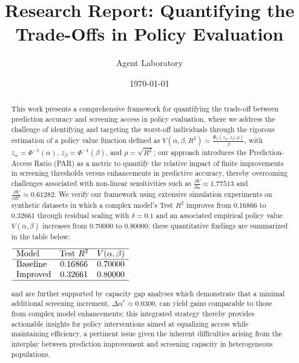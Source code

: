 \documentclass{article} %
\title{Research Report: Quantifying the Trade-Offs in Policy Evaluation}
\author{Agent Laboratory}
\date{\today}
\begin{document}
\maketitle

\begin{abstract}
This work presents a comprehensive framework for quantifying the trade-off between prediction accuracy and screening access in policy evaluation, where we address the challenge of identifying and targeting the worst-off individuals through the rigorous estimation of a policy value function defined as \( V(\alpha,\beta,R^2)=\frac{\Phi_2(z_\alpha,z_\beta;\rho)}{\beta} \), with \( z_\alpha=\Phi^{-1}(\alpha) \), \( z_\beta=\Phi^{-1}(\beta) \), and \( \rho=\sqrt{R^2} \); our approach introduces the Prediction-Access Ratio (PAR) as a metric to quantify the relative impact of finite improvements in screening thresholds versus enhancements in predictive accuracy, thereby overcoming challenges associated with non-linear sensitivities such as \(\frac{\partial V}{\partial \alpha}\approx1.77513\) and \(\frac{\partial V}{\partial R^2}\approx0.61282\). We verify our framework using extensive simulation experiments on synthetic datasets in which a complex model’s Test \(R^2\) improves from 0.16866 to 0.32661 through residual scaling with \(\delta=0.1\) and an associated empirical policy value \( V(\alpha,\beta) \) increases from 0.70000 to 0.80000; these quantitative findings are summarized in the table below: 

\(\begin{array}{lcc} \hline \text{Model} & \text{Test } R^2 & V(\alpha,\beta) \\ \hline \text{Baseline} & 0.16866 & 0.70000 \\ \text{Improved} & 0.32661 & 0.80000 \\ \hline \end{array}\)

and are further supported by capacity gap analyses which demonstrate that a minimal additional screening increment, \(\Delta\alpha^* \approx 0.0300\), can yield gains comparable to those from complex model enhancements; this integrated strategy thereby provides actionable insights for policy interventions aimed at equalizing access while maintaining efficiency, a pertinent issue given the inherent difficulties arising from the interplay between prediction improvement and screening capacity in heterogeneous populations.
\end{abstract}
\end{document}

